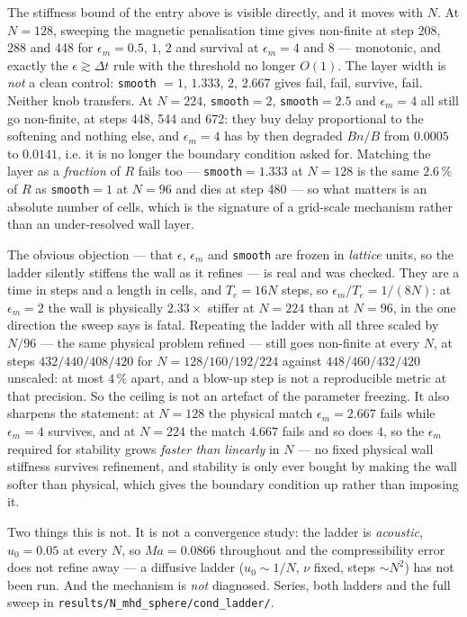 \documentclass[11pt,a4paper]{article}
\newcommand{\code}[1]{\texttt{\small #1}}
\begin{document}
\begin{enumerate}[leftmargin=1.4em,itemsep=4pt]
  The stiffness bound of the entry above is visible directly, and it moves with
  $N$. At $N=128$, sweeping the magnetic penalisation time gives non-finite at
  step 208, 288 and 448 for $\epsilon_m=0.5$, $1$, $2$ and survival at
  $\epsilon_m=4$ and $8$ --- monotonic, and exactly the $\epsilon\gtrsim\Delta t$
  rule with the threshold no longer $O(1)$. The layer width is \emph{not} a
  clean control: \code{smooth} $=1$, $1.333$, $2$, $2.667$ gives fail, fail,
  survive, fail. Neither knob transfers. At $N=224$, \code{smooth}$=2$,
  \code{smooth}$=2.5$ and $\epsilon_m=4$ all still go non-finite, at steps 448,
  544 and 672: they buy delay proportional to the softening and nothing else,
  and $\epsilon_m=4$ has by then degraded $Bn/B$ from $0.0005$ to $0.0141$,
  i.e. it is no longer the boundary condition asked for. Matching the layer as a
  \emph{fraction} of $R$ fails too --- \code{smooth}$=1.333$ at $N=128$ is the
  same $2.6\,\%$ of $R$ as \code{smooth}$=1$ at $N=96$ and dies at step 480 ---
  so what matters is an absolute number of cells, which is the signature of a
  grid-scale mechanism rather than an under-resolved wall layer.

  The obvious objection --- that $\epsilon$, $\epsilon_m$ and \code{smooth} are
  frozen in \emph{lattice} units, so the ladder silently stiffens the wall as it
  refines --- is real and was checked. They are a time in steps and a length in
  cells, and $T_e=16N$ steps, so $\epsilon_m/T_e=1/(8N)$: at $\epsilon_m=2$ the
  wall is physically $2.33\times$ stiffer at $N=224$ than at $N=96$, in the one
  direction the sweep says is fatal. Repeating the ladder with all three scaled
  by $N/96$ --- the same physical problem refined --- still goes non-finite at
  every $N$, at steps $432/440/408/420$ for $N=128/160/192/224$ against
  $448/460/432/420$ unscaled: at most $4\,\%$ apart, and a blow-up step is not a
  reproducible metric at that precision. So the ceiling is not an artefact of
  the parameter freezing. It also sharpens the statement: at $N=128$ the
  physical match $\epsilon_m=2.667$ fails while $\epsilon_m=4$ survives, and at
  $N=224$ the match $4.667$ fails and so does $4$, so the $\epsilon_m$ required
  for stability grows \emph{faster than linearly} in $N$ --- no fixed physical
  wall stiffness survives refinement, and stability is only ever bought by
  making the wall softer than physical, which gives the boundary condition up
  rather than imposing it.

  Two things this is not. It is not a convergence study: the ladder is
  \emph{acoustic}, $u_0=0.05$ at every $N$, so $\mathit{Ma}=0.0866$ throughout
  and the compressibility error does not refine away --- a diffusive ladder
  ($u_0\sim1/N$, $\nu$ fixed, steps $\sim N^2$) has not been run. And the
  mechanism is \emph{not} diagnosed. Series, both ladders and the full sweep in
  \code{results/N\_mhd\_sphere/cond\_ladder/}.


\end{enumerate}
\end{document}
